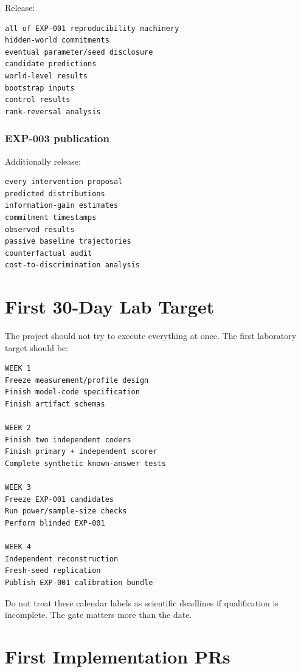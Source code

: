 \documentclass[11pt]{article}
\begin{document}
Release:
\begin{verbatim}
all of EXP-001 reproducibility machinery
hidden-world commitments
eventual parameter/seed disclosure
candidate predictions
world-level results
bootstrap inputs
control results
rank-reversal analysis
\end{verbatim}

\section{EXP-003 publication}

Additionally release:
\begin{verbatim}
every intervention proposal
predicted distributions
information-gain estimates
commitment timestamps
observed results
passive baseline trajectories
counterfactual audit
cost-to-discrimination analysis
\end{verbatim}

\part{First 30-Day Lab Target}

The project should not try to execute everything at once. The first laboratory target should be:
\begin{verbatim}
WEEK 1
Freeze measurement/profile design
Finish model-code specification
Finish artifact schemas

WEEK 2
Finish two independent coders
Finish primary + independent scorer
Complete synthetic known-answer tests

WEEK 3
Freeze EXP-001 candidates
Run power/sample-size checks
Perform blinded EXP-001

WEEK 4
Independent reconstruction
Fresh-seed replication
Publish EXP-001 calibration bundle
\end{verbatim}
Do not treat these calendar labels as scientific deadlines if qualification is incomplete. The gate matters more than the date.

\part{First Implementation PRs}
\end{document}
